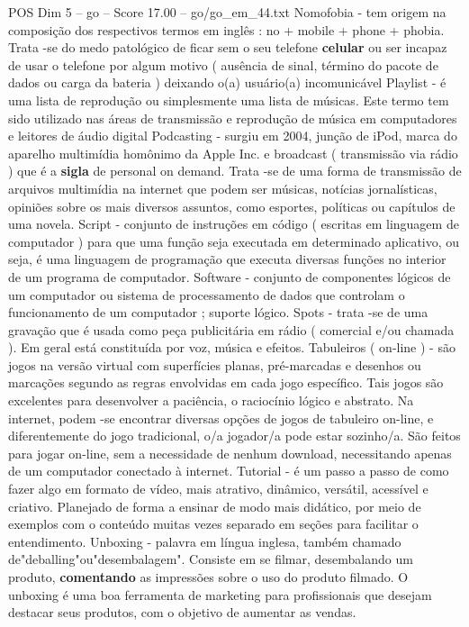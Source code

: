 \begin{textsample}{POS Dim 5 – go – Score 17.00 – go/go\_em\_44.txt}
Nomofobia - tem origem na composição dos respectivos termos em inglês : no + mobile + phone + phobia.
Trata -se do medo patológico de ficar sem o seu telefone \textbf{celular} ou ser incapaz de usar o telefone por algum motivo ( ausência de sinal, término do pacote de dados ou carga da bateria ) deixando o(a) usuário(a) incomunicável Playlist - é uma lista de reprodução ou simplesmente uma lista de músicas.
Este termo tem sido utilizado nas áreas de transmissão e reprodução de música em computadores e leitores de áudio digital Podcasting - surgiu em 2004, junção de iPod, marca do aparelho multimídia homônimo da Apple Inc. e broadcast ( transmissão via rádio ) que é a \textbf{sigla} de personal on demand.
Trata -se de uma forma de transmissão de arquivos multimídia na internet que podem ser músicas, notícias jornalísticas, opiniões sobre os mais diversos assuntos, como esportes, políticas ou capítulos de uma novela.
Script - conjunto de instruções em código ( escritas em linguagem de computador ) para que uma função seja executada em determinado aplicativo, ou seja, é uma linguagem de programação que executa diversas funções no interior de um programa de computador.
Software - conjunto de componentes lógicos de um computador ou sistema de processamento de dados que controlam o funcionamento de um computador ; suporte lógico.
Spots - trata -se de uma gravação que é usada como peça publicitária em rádio ( comercial e/ou chamada ).
Em geral está constituída por voz, música e efeitos.
Tabuleiros ( on-line ) - são jogos na versão virtual com superfícies planas, pré-marcadas e desenhos ou marcações segundo as regras envolvidas em cada jogo específico.
Tais jogos são excelentes para desenvolver a paciência, o raciocínio lógico e abstrato.
Na internet, podem -se encontrar diversas opções de jogos de tabuleiro on-line, e diferentemente do jogo tradicional, o/a jogador/a pode estar sozinho/a.
São feitos para jogar on-line, sem a necessidade de nenhum download, necessitando apenas de um computador conectado à internet.
Tutorial - é um passo a passo de como fazer algo em formato de vídeo, mais atrativo, dinâmico, versátil, acessível e criativo.
Planejado de forma a ensinar de modo mais didático, por meio de exemplos com o conteúdo muitas vezes separado em seções para facilitar o entendimento.
Unboxing - palavra em língua inglesa, também chamado de"deballing"ou"desembalagem".
Consiste em se filmar, desembalando um produto, \textbf{comentando} as impressões sobre o uso do produto filmado.
O unboxing é uma boa ferramenta de marketing para profissionais que desejam destacar seus produtos, com o objetivo de aumentar as vendas.

\end{textsample}
